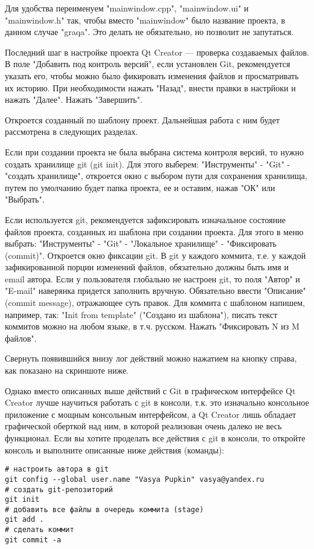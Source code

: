 Для удобства переименуем "mainwindow.cpp", "mainwindow.ui" и "mainwindow.h" так, чтобы вместо "mainwindow" было название проекта, в данном случае "graqa". Это делать не обязательно, но позволит не запутаться.

Последний шаг в настройке проекта Qt Creator — проверка создаваемых файлов. В поле "Добавить под контроль версий", если установлен Git, рекомендуется указать его, чтобы можно было фикировать изменения файлов и просматривать их историю. При необходимости нажать "Назад", внести правки в настрйоки и нажать "Далее". Нажать "Завершить".

Откроется созданный по шаблону проект. Дальнейшая работа с ним будет рассмотрена в следующих разделах.

Если при создании проекта не была выбрана система контроля версий, то нужно создать хранилище git (git init). Для этого выберем: "Инструменты" - "Git" - "создать хранилище", откроется окно с выбором пути для сохранения хранилища, путем по умолчанию будет папка проекта, ее и оставим, нажав "ОК" или "Выбрать".

Если используется git, рекомендуется зафиксировать изначальное состояние файлов проекта, созданных из шаблона при создании проекта. Для этого в меню выбрать: "Инструменты" - "Git" - "Локальное хранилище" - "Фиксировать (commit)". Откроется окно фиксации git. В git у каждого коммита, т.е. у каждой зафикированной порции изменений файлов, обязательно должны быть имя и email автора. Если у пользователя глобально не настроен git, то поля "Автор" и "E-mail" наверянка придется заполнить вручную. Обязательно ввести "Описание" (commit message), отражающее суть правок. Для коммита с шаблоном напишем, например, так: "Init from template" ("Создано из шаблона"), писать текст коммитов можно на любом языке, в т.ч. русском. Нажать "Фиксировать N из M файлов".

Свернуть появившийся внизу лог действий можно нажатием на кнопку справа, как показано на скриншоте ниже.

Однако вместо описанных выше действий с Git в графическом интерфейсе Qt Creator лучше научиться работать с git в консоли, т.к. это изначально консольное приложение с мощным консольным интерфейсом, а Qt Creator лишь обладает графической оберткой над ним, в которой реализован очень далеко не весь функционал. Если вы хотите проделать все действия с git в консоли, то откройте консоль и выполните описанные ниже действия (команды):

\begin{verbatim}
# настроить автора в git
git config --global user.name "Vasya Pupkin" vasya@yandex.ru
# создать git-репозиторий
git init
# добавить все файлы в очередь коммита (stage)
git add .
# сделать коммит
git commit -a
\end{verbatim}

\clearpage
